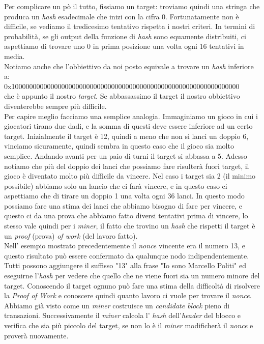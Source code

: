 Per complicare un p\`o il tutto, fissiamo un target: troviamo quindi una stringa che produca un \textit{hash} esadecimale che inizi con la cifra 0. Fortunatamente non \`e difficile, se vediamo il tredicesimo tentativo rispetta i nostri criteri. In termini di probabilit\`a, se gli output della funzione di \textit{hash} sono equamente distribuiti, ci aspettiamo di trovare uno 0 in prima posizione una volta ogni 16 tentativi in media.\\
Notiamo anche che l'obbiettivo da noi posto equivale a trovare un \textit{hash} inferiore a:\\
0x1000000000000000000000000000000000000000000000000000000000000000\\
che \`e appunto il nostro \textit{target}. Se abbassassimo il target il nostro obbiettivo diventerebbe sempre pi\`u difficile.\\
Per capire meglio facciamo una semplice analogia. Immaginiamo un gioco in cui i giocatori tirano due dadi, e la somma di questi deve essere inferiore ad un certo target. Inizialmente il target \`e 12, quindi a meno che non si lanci un doppio 6, vinciamo sicuramente, quindi sembra in questo caso che il gioco sia molto semplice. Andando avanti per un paio di turni il target si abbassa a 5. Adesso notiamo che pi\`u del doppio dei lanci che possiamo fare risulter\`a fuori target, il gioco \`e diventato molto pi\`u difficile da vincere. Nel caso i target sia 2 (il minimo possibile) abbiamo solo un lancio che ci far\`a vincere, e in questo caso ci aspettiamo che di tirare un doppio 1 una volta ogni 36 lanci. In questo modo possiamo fare una stima dei lanci che abbiamo bisogno di fare per vincere, e questo ci da una prova che abbiamo fatto diversi tentativi prima di vincere, lo stesso vale quindi per i \textit{miner}, il fatto che trovino un \textit{hash} che rispetti il target \`e un \textit{proof} (prova) \textit{of work} (del lavoro fatto).\\
Nell' esempio mostrato precedentemente il \textit{nonce} vincente era il numero 13, e questo risultato pu\`o essere confermato da qualunque nodo indipendentemente. Tutti possono aggiungere il suffisso "13" alla frase "Io sono Marcello Politi" ed eseguirne l'\textit{hash} per vedere che quello che ne viene fuori sia un numero minore del target. Conoscendo il target ognuno pu\`o fare una stima della difficolt\`a di risolvere la \textit{Proof of Work} e conoscere quindi quanto lavoro ci vuole per trovare il \textit{nonce}.\\
Abbiamo gi\`a visto come un \textit{miner} costruisce un \textit{candidate block} pieno di transazioni. Successivamente il \textit{miner} calcola l' \textit{hash} dell'\textit{header} del blocco e verifica che sia pi\`u piccolo del target, se non lo \`e il \textit{miner} modificher\`a il \textit{nonce} e prover\`a nuovamente.


